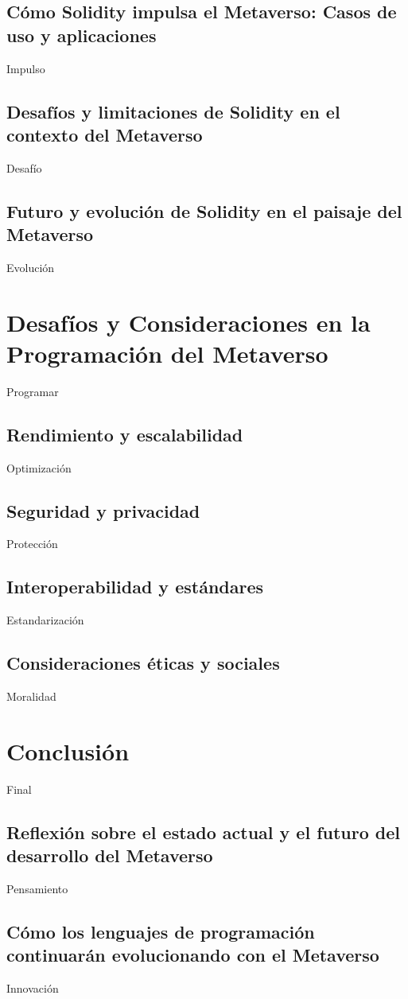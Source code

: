 \documentclass[a4paper,10pt]{article}
\begin{document}
	\subsection{Cómo Solidity impulsa el Metaverso: Casos de uso y aplicaciones}
	Impulso
	\subsection{Desafíos y limitaciones de Solidity en el contexto del Metaverso}
	Desafío
	\subsection{Futuro y evolución de Solidity en el paisaje del Metaverso}
	Evolución
	
	\section{Desafíos y Consideraciones en la Programación del Metaverso}
	Programar
	\subsection{Rendimiento y escalabilidad}
	Optimización
	\subsection{Seguridad y privacidad}
	Protección
	\subsection{Interoperabilidad y estándares}
	Estandarización
	\subsection{Consideraciones éticas y sociales}
	Moralidad
	
	\section{Conclusión}
	Final
	\subsection{Reflexión sobre el estado actual y el futuro del desarrollo del Metaverso}
	Pensamiento
	\subsection{Cómo los lenguajes de programación continuarán evolucionando con el Metaverso}
	Innovación

	\printbibliography[heading=bibintoc]
\end{document}
